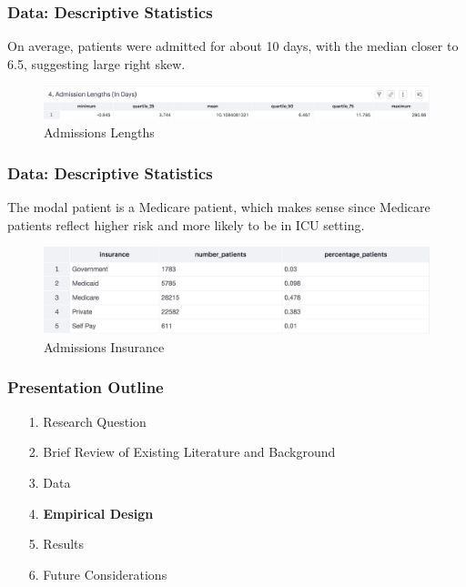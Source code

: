 \documentclass{beamer}
\begin{document}
\begin{frame}
\frametitle{Data: Descriptive Statistics}
On average, patients were admitted for about 10 days, with the median closer to 6.5, suggesting large right skew.

\begin{figure}[H]
\centering
\caption{Admissions Lengths}
\label{AdmissionsLengths}
\includegraphics[page = {1}, scale = 0.2]{./images/admissions-lengths.png}
\end{figure}
\end{frame}

\begin{frame}
\frametitle{Data: Descriptive Statistics}
The modal patient is a Medicare patient, which makes sense since Medicare patients reflect higher risk and more likely to be in ICU setting.

\begin{figure}[H]
\centering
\caption{Admissions Insurance}
\label{AdmissionsInsurance}
\includegraphics[page = {1}, scale = 0.4]{./images/admissions-insurance-summary.png}
\end{figure}
\end{frame}

\begin{frame}
\label{Presentation Outline 4}
\frametitle{Presentation Outline}
\begin{enumerate}
\item[1.] Research Question
\newline
\item[2.] Brief Review of Existing Literature and Background
\newline
\item[3.] Data
\newline
\item[4.] \textbf{Empirical Design}
\newline
\item[5.] Results
\newline
\item[6.] Future Considerations
\end{enumerate}
\end{frame}
\end{document}
